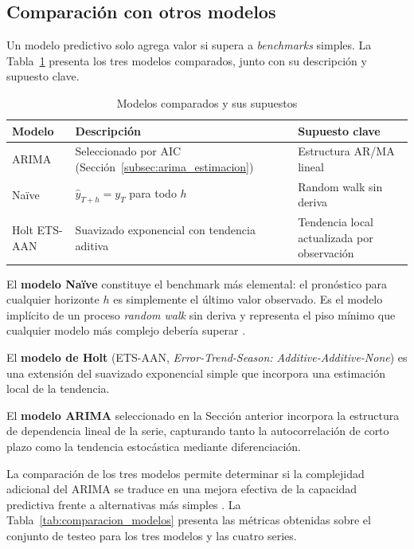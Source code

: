 \documentclass[12pt, a4paper]{article}
\begin{document}
\subsection{Comparación con otros modelos}

Un modelo predictivo solo agrega valor si supera a \textit{benchmarks} simples. La Tabla~\ref{tab:modelos_benchmark} presenta los tres modelos comparados, junto con su descripción y supuesto clave.

\begin{table}[H]
    \centering
    \caption{Modelos comparados y sus supuestos}
    \label{tab:modelos_benchmark}
    \begin{tabular}{lll}
        \toprule
        \textbf{Modelo} & \textbf{Descripción} & \textbf{Supuesto clave} \\
        \midrule
        ARIMA     & Seleccionado por AIC (Sección~\ref{subsec:arima_estimacion}) & Estructura AR/MA lineal \\
        Naïve     & $\hat{y}_{T+h} = y_T$ para todo $h$                           & Random walk sin deriva \\
        Holt ETS-AAN & Suavizado exponencial con tendencia aditiva               & Tendencia local actualizada por observación \\
        \bottomrule
    \end{tabular}
\end{table}

El \textbf{modelo Naïve} constituye el benchmark más elemental: el pronóstico para cualquier horizonte $h$ es simplemente el último valor observado. Es el modelo implícito de un proceso \textit{random walk} sin deriva y representa el piso mínimo que cualquier modelo más complejo debería superar \cite{hyndman2018}.

El \textbf{modelo de Holt} (ETS-AAN, \textit{Error-Trend-Season: Additive-Additive-None}) es una extensión del suavizado exponencial simple que incorpora una estimación local de la tendencia. 

El \textbf{modelo ARIMA} seleccionado en la Sección anterior incorpora la estructura de dependencia lineal de la serie, capturando tanto la autocorrelación de corto plazo como la tendencia estocástica mediante diferenciación.

La comparación de los tres modelos permite determinar si la complejidad adicional del ARIMA se traduce en una mejora efectiva de la capacidad predictiva frente a alternativas más simples \cite{diebold2007}. La Tabla~\ref{tab:comparacion_modelos} presenta las métricas obtenidas sobre el conjunto de testeo para los tres modelos y las cuatro series.
\end{document}

